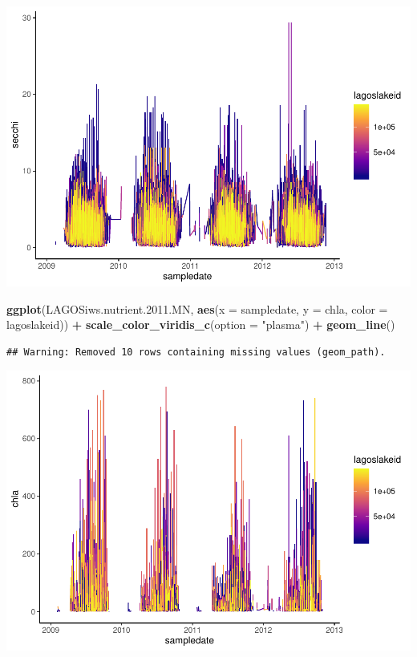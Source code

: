 \documentclass[12pt,]{article}
\newenvironment{Shaded}{\begin{snugshade}}{\end{snugshade}}
\newcommand{\DataTypeTok}[1]{\textcolor[rgb]{0.13,0.29,0.53}{#1}}
\newcommand{\FloatTok}[1]{\textcolor[rgb]{0.00,0.00,0.81}{#1}}
\newcommand{\KeywordTok}[1]{\textcolor[rgb]{0.13,0.29,0.53}{\textbf{#1}}}
\newcommand{\NormalTok}[1]{#1}
\newcommand{\OperatorTok}[1]{\textcolor[rgb]{0.81,0.36,0.00}{\textbf{#1}}}
\newcommand{\StringTok}[1]{\textcolor[rgb]{0.31,0.60,0.02}{#1}}
\begin{document}
\includegraphics{Bollt_Greif_Raby_Roth_Project_Draft_files/figure-latex/Visualize_data-1.pdf}

\begin{Shaded}
\begin{Highlighting}[]
\KeywordTok{ggplot}\NormalTok{(LAGOSiws.nutrient.}\FloatTok{2011.}\NormalTok{MN, }
       \KeywordTok{aes}\NormalTok{(}\DataTypeTok{x =}\NormalTok{ sampledate, }\DataTypeTok{y =}\NormalTok{ chla, }\DataTypeTok{color =}\NormalTok{ lagoslakeid)) }\OperatorTok{+}
\StringTok{  }\KeywordTok{scale_color_viridis_c}\NormalTok{(}\DataTypeTok{option =} \StringTok{"plasma"}\NormalTok{) }\OperatorTok{+}
\StringTok{  }\KeywordTok{geom_line}\NormalTok{() }
\end{Highlighting}
\end{Shaded}

\begin{verbatim}
## Warning: Removed 10 rows containing missing values (geom_path).
\end{verbatim}

\includegraphics{Bollt_Greif_Raby_Roth_Project_Draft_files/figure-latex/Visualize_data-2.pdf}
\end{document}
